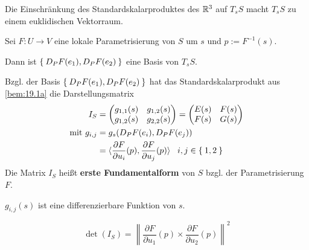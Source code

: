 \begin{bemerkung}%
    \begin{bemenum}
        \item \label{bem:19.1a} Die Einschränkung des Standardskalarproduktes des $\mathbb{R}^3$ auf
              $T_s S$ macht $T_s S$ zu einem euklidischen Vektorraum.
        \item Sei $F: U \rightarrow V$ eine lokale Parametrisierung von $S$ um
              $s$ und $p := F^{-1}(s)$.

              Dann ist $\Set{D_P F(e_1), D_P F(e_2)}$ eine Basis von $T_s S$.
        \item Bzgl. der Basis $\Set{D_P F(e_1), D_P F(e_2)}$ hat das 
              Standardskalarprodukt aus \cref{bem:19.1a} die Darstellungsmatrix
              \begin{align*}
                I_S &= \begin{pmatrix}
                          g_{1,1}(s) & g_{1,2}(s)\\
                          g_{1,2}(s) & g_{2,2}(s)
                       \end{pmatrix} =
                       \begin{pmatrix}
                          E(s) & F(s) \\
                          F(s) & G(s)
                       \end{pmatrix}\\
       \text{mit } g_{i,j} &= g_s(D_P F(e_i), D_P F(e_j))\\
                      &= \langle \frac{\partial F}{\partial u_i} (p), \frac{\partial F}{\partial u_j} (p) \rangle \;\;\; i,j \in \Set{1,2}
              \end{align*}
              Die Matrix $I_S$ heißt \textbf{erste Fundamentalform}
              von $S$ bzgl. der Parametrisierung $F$.
        \item $g_{i,j}(s)$ ist eine differenzierbare Funktion von $s$.
    \end{bemenum}
\end{bemerkung}

\begin{bemerkung}
    \[\det(I_S) = \left \| \frac{\partial F}{\partial u_1}(p) \times \frac{\partial F}{\partial u_2}(p) \right \|^2\] 
\end{bemerkung}

